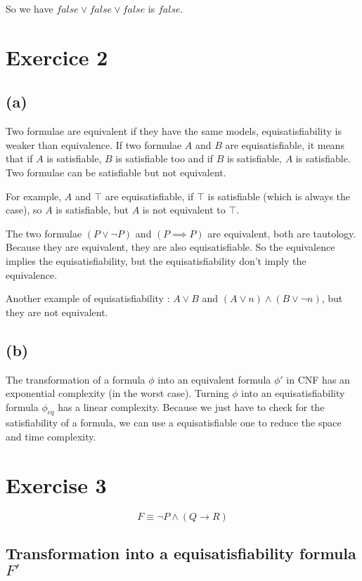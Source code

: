 \documentclass[a4paper,11pt]{report}
\begin{document}
So we have $false \vee false \vee false$ is $false$.

\section*{Exercice 2}

\subsection*{(a)}

Two formulae are equivalent if they have the same models, equisatisfiability is
weaker than equivalence. If two formulae $A$ and $B$ are equisatisfiable, it
means that if $A$ is satisfiable, $B$ is satisfiable too and if $B$ is
satisfiable, $A$ is satisfiable. Two formulae can be satisfiable but not
equivalent.

For example, $A$ and $\top$ are equisatisfiable, if $\top$ is satisfiable (which
is always the case), so $A$ is satisfiable, but $A$ is not equivalent to $\top$.

The two formulae $(P \vee \neg P)$ and $(P \implies P)$ are equivalent, both are
tautology. Because they are equivalent, they are also equisatisfiable. So the
equivalence implies the equisatisfiability, but the equisatisfiability don't
imply the equivalence.

Another example of equisatisfiability : $A \vee B$ and $(A \vee n) \wedge (B
\vee \neg n)$, but they are not equivalent.

\subsection*{(b)}

The transformation of a formula $\phi$ into an equivalent formula $\phi'$ in CNF
has an exponential complexity (in the worst case). Turning $\phi$ into an
equisatisfiability formula $\phi_{eq}$ has a linear complexity. Because we just
have to check for the satisfiability of a formula, we can use a equisatisfiable
one to reduce the space and time complexity.

\section*{Exercise 3}

\[
  F \equiv \neg P \wedge (Q \to R)
\]

\subsection*{Transformation into a equisatisfiability formula $F'$}
\end{document}
